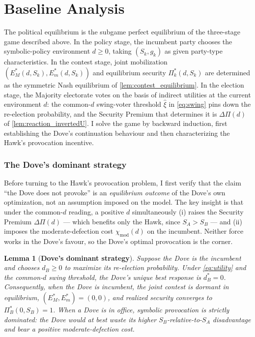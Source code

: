 \documentclass[11pt,twoside]{extarticle}
\newtheorem{lemma}{Lemma}
\begin{document}
\section{Baseline Analysis}

The political equilibrium is the subgame perfect equilibrium of the three-stage game described above. In the policy stage, the incumbent party chooses the symbolic-policy environment $d\ge 0$, taking $(S_k,g_k)$ as given party-type characteristics. In the contest stage, joint mobilization $(E_M^*(d,S_k),E_m^*(d,S_k))$ and equilibrium security $\Pi_k^*(d,S_k)$ are determined as the symmetric Nash equilibrium of \autoref{lem:contest_equilibrium}. In the election stage, the Majority electorate votes on the basis of indirect utilities at the current environment $d$: the common-$d$ swing-voter threshold $\hat{\xi}$ in \autoref{eq:swing} pins down the re-election probability, and the Security Premium that determines it is $\Delta\Pi(d)$ of \autoref{lem:reaction_invertedU}. I solve the game by backward induction, first establishing the Dove's continuation behaviour and then characterizing the Hawk's provocation incentive.

\subsubsection*{The Dove's dominant strategy}

Before turning to the Hawk's provocation problem, I first verify that the claim ``the Dove does not provoke'' is an \emph{equilibrium outcome} of the Dove's own optimization, not an assumption imposed on the model. The key insight is that under the common-$d$ reading, a positive $d$ simultaneously (i) raises the Security Premium $\Delta\Pi(d)$ — which benefits only the Hawk, since $S_A>S_B$ — and (ii) imposes the moderate-defection cost $\chi_{\mathrm{mod}}(d)$ on the incumbent. Neither force works in the Dove's favour, so the Dove's optimal provocation is the corner.

\begin{lemma}[\textbf{Dove's dominant strategy}]\label{lem:dove_corner}
Suppose the Dove is the incumbent and chooses $d_B\ge 0$ to maximize its re-election probability. Under \autoref{eq:utility} and the common-$d$ swing threshold, the Dove's unique best response is $d_B^*=0$. Consequently, when the Dove is incumbent, the joint contest is dormant in equilibrium, $(E_M^*,E_m^*)=(0,0)$, and realized security converges to $\Pi_B^*(0,S_B)=1$. When a Dove is in office, symbolic provocation is strictly dominated: the Dove would at best waste its higher $S_B$-relative-to-$S_A$ disadvantage and bear a positive moderate-defection cost.
\end{lemma}
\end{document}
